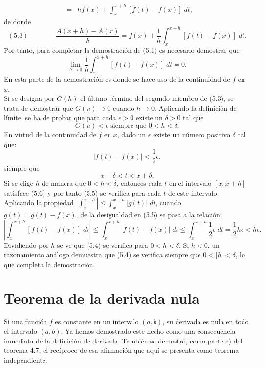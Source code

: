 \begin{teo}
$$\begin{array}{rcl}
			& = & \displaystyle hf(x) + \int_x^{x+h} \left[f(t)-f(x)\right]\; dt,
	\end{array}$$
	de donde
	\begin{equation}
	    (5.3) \qquad \qquad \dfrac{A(x+h)-A(x)}{h}=f(x)+\dfrac{1}{h}\int_{x}^{x+h}\left[f(t)-f(x)\right]\; dt.
	\end{equation}
	Por tanto, para completar la demostración de (5.1) es necesario demostrar que 
	$$\lim_{h\to 0}\dfrac{1}{h}\int_x^{x+h}\left[f(t)-f(x)\right]\; dt = 0.$$
	En esta parte de la demostración es donde se hace uso de la continuidad de $f$ en $x$.\\
	Si se designa por $G(h)$ el último término del segundo miembro de (5.3), se trata de demostrar que $G(h)\to 0$ cuando $h\to 0$. Aplicando la definición de límite, se ha de probar que para cada $\epsilon>0$ existe un $\delta>0$ tal que
	\begin{equation}
	    G(h)<\epsilon \mbox{ siempre que } 0<h<\delta.
	\end{equation}
	En virtud de la continuidad de $f$ en $x$, dado un $\epsilon$ existe un número positivo $\delta$ tal que:
	\begin{equation}
	|f(t)-f(x)|<\dfrac{1}{2}\epsilon.
	\end{equation}
	siempre que 
	\begin{equation}
	x-\delta<t<x+\delta.
	\end{equation}
	Si se elige $h$ de manera que $0<h<\delta$, entonces cada $t$ en el intervalo $[x,x+h]$ satisface (5.6) y por tanto (5.5) se verifica para cada $t$ de este intervalo. Aplicando la propiedad $|\int_x^{x+h}|\leq \int_x^{x+h}|g(t)|\; dt$, cuando $g(t)=g(t)-f(x)$, de la desigualdad en (5.5) se pasa a la relación:
	$$\left|\int_x^{x+h}\left[f(t)-f(x)\right]\; dt\right|\leq \int_x^{x+h}|f(t)-f(x)|\; dt \leq \int_x^{x+h}\dfrac{1}{2} \epsilon \; dt = \dfrac{1}{2}h\epsilon < h\epsilon.$$
	Dividiendo por $h$ se ve que (5.4) se verifica para $0<h<\delta$. Si $h<0$, un razonamiento análogo demuestra que (5.4) se verifica siempre que $0<|h|<\delta$, lo que completa la demostración.
\end{teo}

\section{Teorema de la derivada nula}

Si una función $f$ es constante en un intervalo $(a, b)$, su derivada es nula en todo el intervalo $(a, b)$. Ya hemos demostrado este hecho como una consecuencia inmediata de la definición de derivada. También se demostró, como parte c) del teorema 4.7, el recíproco de esa afirmación que aquí se presenta como teorema independiente.

